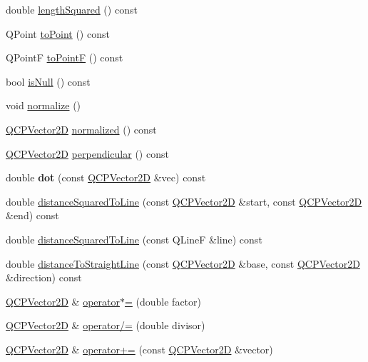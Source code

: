 \begin{DoxyCompactItemize}
\item 
double \hyperlink{class_q_c_p_vector2_d_a766585459d84cb149334fda1a498b2e5}{length\+Squared} () const
\item 
Q\+Point \hyperlink{class_q_c_p_vector2_d_add3edf75de9b7bf1abc693b973b2e906}{to\+Point} () const
\item 
Q\+PointF \hyperlink{class_q_c_p_vector2_d_acd7af3f4a62833ada58be3f3021dbbac}{to\+PointF} () const
\item 
bool \hyperlink{class_q_c_p_vector2_d_ace99f200b347b14864808213eef16593}{is\+Null} () const
\item 
void \hyperlink{class_q_c_p_vector2_d_ad83268be370685c2a0630acc0fb1a425}{normalize} ()
\item 
\hyperlink{class_q_c_p_vector2_d}{Q\+C\+P\+Vector2D} \hyperlink{class_q_c_p_vector2_d_a707bb3af3b1f9331a2450ec75eaf7eb0}{normalized} () const
\item 
\hyperlink{class_q_c_p_vector2_d}{Q\+C\+P\+Vector2D} \hyperlink{class_q_c_p_vector2_d_a0e08d09f9027784237e302e32290b001}{perpendicular} () const
\item 
\mbox{\label{class_q_c_p_vector2_d_a39f8d28db7dbffcca6aa63a1f1f6e176}} 
double {\bfseries dot} (const \hyperlink{class_q_c_p_vector2_d}{Q\+C\+P\+Vector2D} \&vec) const
\item 
double \hyperlink{class_q_c_p_vector2_d_a14840cd3da80cfee4eb3f8977cab89ab}{distance\+Squared\+To\+Line} (const \hyperlink{class_q_c_p_vector2_d}{Q\+C\+P\+Vector2D} \&start, const \hyperlink{class_q_c_p_vector2_d}{Q\+C\+P\+Vector2D} \&end) const
\item 
double \hyperlink{class_q_c_p_vector2_d_a0c44ca97d46ee04feec32c1c57e70831}{distance\+Squared\+To\+Line} (const Q\+LineF \&line) const
\item 
double \hyperlink{class_q_c_p_vector2_d_ae240b845c3744e43a5d0aa7b2bb66c19}{distance\+To\+Straight\+Line} (const \hyperlink{class_q_c_p_vector2_d}{Q\+C\+P\+Vector2D} \&base, const \hyperlink{class_q_c_p_vector2_d}{Q\+C\+P\+Vector2D} \&direction) const
\item 
\hyperlink{class_q_c_p_vector2_d}{Q\+C\+P\+Vector2D} \& \hyperlink{class_q_c_p_vector2_d_aa52a246d168f475a4231c7bdfdac7df1}{operator$\ast$=} (double factor)
\item 
\hyperlink{class_q_c_p_vector2_d}{Q\+C\+P\+Vector2D} \& \hyperlink{class_q_c_p_vector2_d_aefa55eb9282c066a330ca281881e0ec0}{operator/=} (double divisor)
\item 
\hyperlink{class_q_c_p_vector2_d}{Q\+C\+P\+Vector2D} \& \hyperlink{class_q_c_p_vector2_d_aa2c34754ce8839b2d074dec741783c5e}{operator+=} (const \hyperlink{class_q_c_p_vector2_d}{Q\+C\+P\+Vector2D} \&vector)

\end{DoxyCompactItemize}
